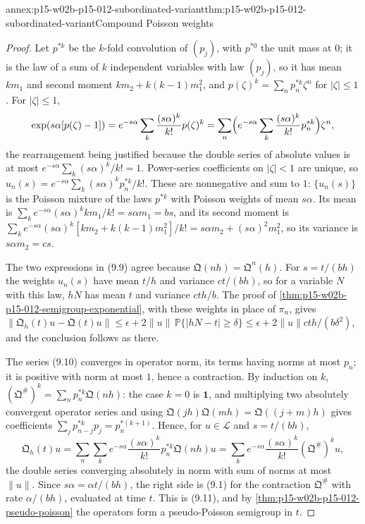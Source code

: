 \begin{annexitem}{annex:p15-w02b-p15-012-subordinated-variant}{thm:p15-w02b-p15-012-subordinated-variant}{Compound Poisson weights}
\begin{proof}
Let \(p^{*k}\) be the \(k\)-fold convolution of \((p_j)\), with
\(p^{*0}\) the unit mass at \(0\); it is the law of a sum of \(k\) independent
variables with law \((p_j)\), so it has mean \(km_1\) and second moment
\(km_2+k(k-1)m_1^2\), and \(p(\zeta)^k=\sum_np^{*k}_n\zeta^n\) for
\(|\zeta|\leq1\). For \(|\zeta|\leq1\),
\[
 \exp(s\alpha[p(\zeta)-1])=e^{-s\alpha}\sum_k\frac{(s\alpha)^k}{k!}p(\zeta)^k
   =\sum_n\Bigl(e^{-s\alpha}\sum_k\frac{(s\alpha)^k}{k!}p^{*k}_n\Bigr)\zeta^n,
\]
the rearrangement being justified because the double series of absolute
values is at most \(e^{-s\alpha}\sum_k(s\alpha)^k/k!=1\). Power-series
coefficients on \(|\zeta|<1\) are unique, so
\(u_n(s)=e^{-s\alpha}\sum_k(s\alpha)^kp^{*k}_n/k!\). These are nonnegative and
sum to \(1\): \(\{u_n(s)\}\) is the Poisson mixture of the laws \(p^{*k}\)
with Poisson weights of mean \(s\alpha\). Its mean is
\(\sum_k e^{-s\alpha}(s\alpha)^kkm_1/k!=s\alpha m_1=bs\), and its second moment
is \(\sum_ke^{-s\alpha}(s\alpha)^k[km_2+k(k-1)m_1^2]/k!=s\alpha m_2+(s\alpha)^2m_1^2\),
so its variance is \(s\alpha m_2=cs\).

The two expressions in (9.9) agree because \(\mathfrak Q(nh)=\mathfrak Q^n(h)\).
For \(s=t/(bh)\) the weights \(u_n(s)\) have mean \(t/h\) and variance
\(ct/(bh)\), so for a variable \(N\) with this law, \(hN\) has mean \(t\) and
variance \(cth/b\). The proof of
\cref{thm:p15-w02b-p15-012-semigroup-exponential}, with these weights in place
of \(\pi_n\), gives
\(\|\mathfrak Q_h(t)u-\mathfrak Q(t)u\|\leq\epsilon+2\|u\|\,\mathbb P\{|hN-t|\geq\delta\}
\leq\epsilon+2\|u\|cth/(b\delta^2)\), and the conclusion follows as there.

The series (9.10) converges in operator norm, its terms having norms at most
\(p_n\); it is positive with norm at most \(1\), hence a contraction. By
induction on \(k\), \((\mathfrak Q^\#)^k=\sum_np^{*k}_n\mathfrak Q(nh)\): the
case \(k=0\) is \(\mathbf 1\), and multiplying two absolutely convergent
operator series and using \(\mathfrak Q(jh)\mathfrak Q(mh)=\mathfrak Q((j+m)h)\)
gives coefficients \(\sum_jp^{*k}_{n-j}p_j=p^{*(k+1)}_n\). Hence, for
\(u\in\mathscr L\) and \(s=t/(bh)\),
\[
 \mathfrak Q_h(t)u=\sum_n\sum_ke^{-s\alpha}\frac{(s\alpha)^k}{k!}p^{*k}_n\mathfrak Q(nh)u
   =\sum_ke^{-s\alpha}\frac{(s\alpha)^k}{k!}(\mathfrak Q^\#)^ku,
\]
the double series converging absolutely in norm with sum of norms at most
\(\|u\|\). Since \(s\alpha=\alpha t/(bh)\), the right side is (9.1) for the
contraction \(\mathfrak Q^\#\) with rate \(\alpha/(bh)\), evaluated at time
\(t\). This is (9.11), and by \cref{thm:p15-w02b-p15-012-pseudo-poisson} the
operators form a pseudo-Poisson semigroup in \(t\).
\end{proof}
\end{annexitem}

